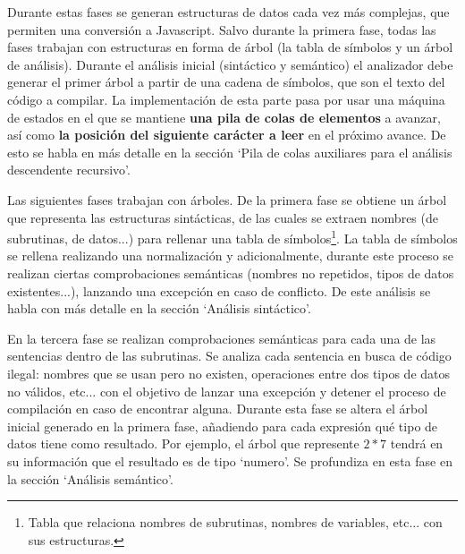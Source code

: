 \documentclass{report}
\begin{document}
	\vspace{10px}
	
	Durante estas fases se generan estructuras de datos cada vez más complejas, que permiten una conversión a Javascript. Salvo durante la primera fase, todas las fases trabajan con estructuras en forma de árbol (la tabla de símbolos y un árbol de análisis). Durante el análisis inicial (sintáctico y semántico) el analizador debe generar el primer árbol a partir de una cadena de símbolos, que son el texto del código a compilar. La implementación de esta parte pasa por usar una máquina de estados en el que se mantiene \textbf{una pila de colas de elementos} a avanzar, así como \textbf{la posición del siguiente carácter a leer} en el próximo avance. De esto se habla en más detalle en la sección `Pila de colas auxiliares para el análisis descendente recursivo'. 
	
	\vspace{10px}
	
	Las siguientes fases trabajan con árboles. De la primera fase se obtiene un árbol que representa las estructuras sintácticas, de las cuales se extraen nombres (de subrutinas, de datos...) para rellenar una tabla de símbolos\footnote{Tabla que relaciona nombres de subrutinas, nombres de variables, etc... con sus estructuras.}. La tabla de símbolos se rellena realizando una normalización y adicionalmente, durante este proceso se realizan ciertas comprobaciones semánticas (nombres no repetidos, tipos de datos existentes...), lanzando una excepción en caso de conflicto. De este análisis se habla con más detalle en la sección `Análisis sintáctico'.
	
	\vspace{10px}
	
	En la tercera fase se realizan comprobaciones semánticas para cada una de las sentencias dentro de las subrutinas. Se analiza cada sentencia en busca de código ilegal: nombres que se usan pero no existen, operaciones entre dos tipos de datos no válidos, etc... con el objetivo de lanzar una excepción y detener el proceso de compilación en caso de encontrar alguna. Durante esta fase se altera el árbol inicial generado en la primera fase, añadiendo para cada expresión qué tipo de datos tiene como resultado. Por ejemplo, el árbol que represente $2 * 7$ tendrá en su información que el resultado es de tipo `numero'.  Se profundiza en esta fase en la sección `Análisis semántico'.
	
	\vspace{10px}
	
\end{document}
